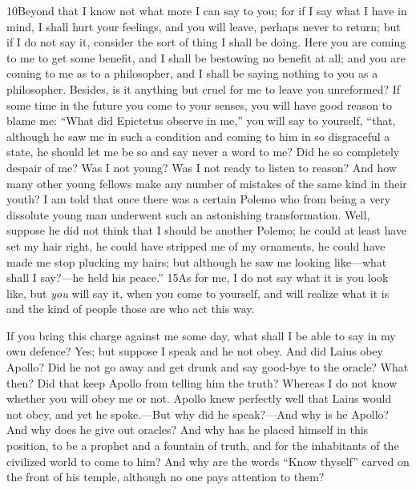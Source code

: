 10Beyond that I know not what more I can say to you; for if I say what I have in mind, I shall hurt your feelings, and you will leave, perhaps never to return; but if I do not say it, consider the sort of thing I shall be doing. Here you are coming to me to get some benefit, and I shall be bestowing no benefit at all; and you are coming to me as to a philosopher, and I shall be saying nothing to you as a philosopher. Besides, is it anything but cruel for me to leave you unreformed? If some time in the future you come to your senses, you will have good reason to blame me: ``What did Epictetus observe in me,'' you will say to yourself, ``that, although he saw me in such a condition and coming to him in so disgraceful a state, he should let me be so and say never a word to me? Did he so completely despair of me? Was I not young? Was I not ready to listen to reason? And how many other young fellows make any number of mistakes of the same kind in their youth? I am told that once there was a certain Polemo who from being a very dissolute young man underwent such an astonishing transformation. Well, suppose he did not think that I should be another Polemo; he could at least have set my hair right, he could have stripped me of my ornaments, he could have made me stop plucking my hairs; but although he saw me looking like—what shall I say?—he held his peace.'' 15As for me, I do not say what it is you look like, but \emph{you} will say it, when you come to yourself, and will realize what it is and the kind of people those are who act this way.

If you bring this charge against me some day, what shall I be able to say in my own defence? Yes; but suppose I speak and he not obey. And did Laius obey Apollo? Did he not go away and get drunk and say good-bye to the oracle? What then? Did that keep Apollo from telling him the truth? Whereas I do not know whether you will obey me or not. Apollo knew perfectly well that Laius would not obey, and yet he spoke.—But why did he speak?—And why is he Apollo? And why does he give out oracles? And why has he placed himself in this position, to be a prophet and a fountain of truth, and for the inhabitants of the civilized world to come to him? And why are the words ``Know thyself'' carved on the front of his temple, although no one pays attention to them?

